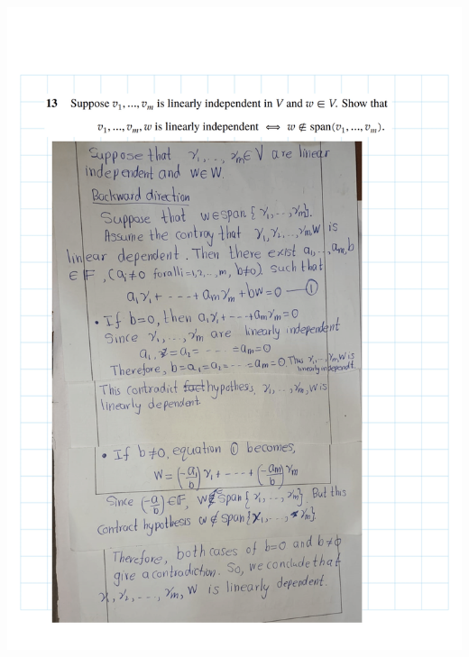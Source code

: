 \documentclass[
]{book}
\theoremstyle{definition}
\theoremstyle{definition}
\theoremstyle{definition}
\theoremstyle{definition}
\theoremstyle{remark}
\begin{document}
\includegraphics{fig/Ex2A/Ex2A-15.png}
\end{document}
